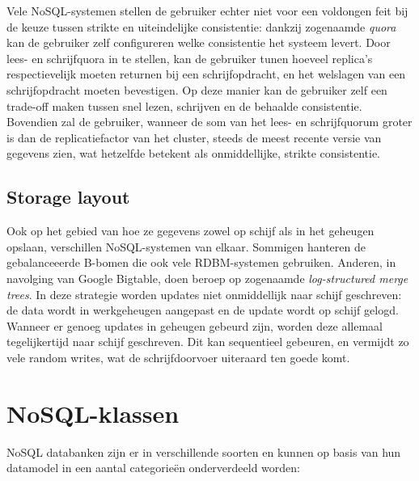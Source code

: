 Vele NoSQL-systemen stellen de gebruiker echter niet voor een voldongen feit bij de keuze tussen strikte en uiteindelijke consistentie: dankzij zogenaamde \textit{quora} kan de gebruiker zelf configureren welke consistentie het systeem levert. Door lees- en schrijfquora in te stellen, kan de gebruiker tunen hoeveel replica's respectievelijk moeten returnen bij een schrijfopdracht, en het welslagen van een schrijfopdracht moeten bevestigen. Op deze manier kan de gebruiker zelf een trade-off maken tussen snel lezen, schrijven en de behaalde consistentie. Bovendien zal de gebruiker, wanneer de som van het lees- en schrijfquorum groter is dan de replicatiefactor van het cluster, steeds de meest recente versie van gegevens zien, wat hetzelfde betekent als onmiddellijke, strikte consistentie.

\subsection{Storage layout}
\label{storage_layout}
Ook op het gebied van hoe ze gegevens zowel op schijf als in het geheugen opslaan, verschillen NoSQL-systemen van elkaar. Sommigen hanteren de gebalanceeerde B-bomen die ook vele RDBM-systemen gebruiken. Anderen, in navolging van Google Bigtable, doen beroep op zogenaamde \textit{log-structured merge trees}. In deze strategie worden updates niet onmiddellijk naar schijf geschreven: de data wordt in werkgeheugen aangepast en de update wordt op schijf gelogd. Wanneer er genoeg updates in geheugen gebeurd zijn, worden deze allemaal tegelijkertijd naar schijf geschreven. Dit kan sequentieel gebeuren, en vermijdt zo vele random writes, wat de schrijfdoorvoer uiteraard ten goede komt. 


\section{NoSQL-klassen}

NoSQL databanken zijn er in verschillende soorten en kunnen op basis van hun datamodel in een aantal categorie\"en onderverdeeld worden:

